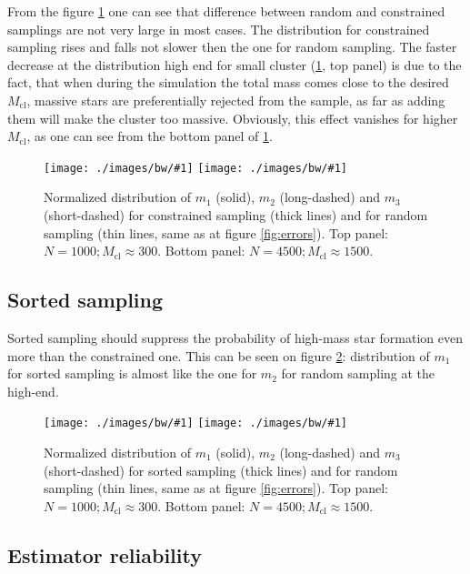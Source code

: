 \documentclass{aastex}
\newcommand{\Mcl}{M_{\mathrm{cl}}}
\newcommand{\includeEPSx}[1]{\texttt{[image: ./images/bw/\#1]}}
\begin{document}
From the figure \ref{fig:compare2} one can see that difference between random and constrained samplings are not very large in most cases. The distribution for constrained sampling rises and falls not slower then the one for random sampling. The faster decrease at the distribution high end for small cluster (\ref{fig:compare2}, top panel) is due to the fact, that when during the simulation the total mass comes close to the desired $\Mcl$, massive stars are preferentially rejected from the sample, as far as adding them will make the cluster too massive. Obviously, this effect vanishes for higher $\Mcl$, as one can see from the bottom panel of \ref{fig:compare2}.	

\begin{figure}
  \begin{center}
   \includeEPSx{compare2.eps}
   \includeEPSx{compare2a.eps}
  \end{center}
 \caption{Normalized distribution of $m_1$ (solid), $m_2$ (long-dashed) and $m_3$ (short-dashed) for constrained sampling (thick lines) and for random sampling (thin lines, same as at figure \ref{fig:errors}). Top panel: $N = 1000; \Mcl \approx 300$. Bottom panel:  $N = 4500; \Mcl \approx 1500$.  } \label{fig:compare2}
\end{figure}


\subsection{Sorted sampling}\label{sec:sorted}

Sorted sampling should suppress the probability of high-mass star formation even more than the constrained one. This can be seen on figure \ref{fig:compare3}: distribution of $m_1$ for sorted sampling is almost like the one for $m_2$ for random sampling at the high-end.

\begin{figure} 
  \begin{center}
   \includeEPSx{compare3.eps}
   \includeEPSx{compare3a.eps}
  \end{center}
 \caption{Normalized distribution of $m_1$ (solid), $m_2$ (long-dashed) and $m_3$ (short-dashed) for sorted sampling (thick lines) and for random sampling (thin lines, same as at figure \ref{fig:errors}). Top panel: $N = 1000; \Mcl \approx 300$. Bottom panel:  $N = 4500; \Mcl \approx 1500$.  }\label{fig:compare3}
\end{figure}

\subsection{Estimator reliability}
\end{document}

